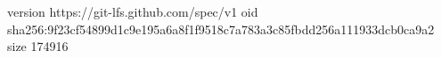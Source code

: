 version https://git-lfs.github.com/spec/v1
oid sha256:9f23cf54899d1c9e195a6a8f1f9518c7a783a3c85fbdd256a111933dcb0ca9a2
size 174916
